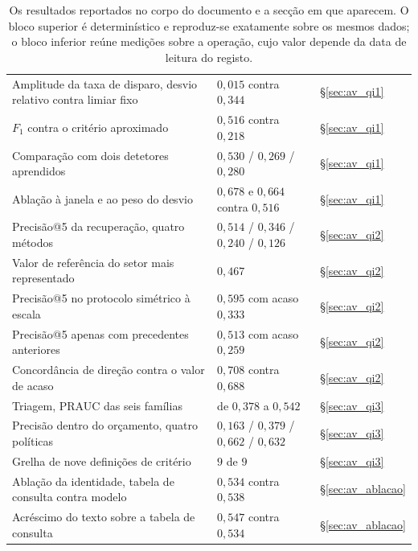 \begin{table}[!htbp]
\caption[Cada resultado e o procedimento que o produz]{Os resultados reportados no corpo do
documento e a secção em que aparecem. O bloco superior é determinístico e reproduz-se exatamente
sobre os mesmos dados; o bloco inferior reúne medições sobre a operação, cujo valor depende da data
de leitura do registo.}
\label{tab:ap_numeros}
\centering
\small
\begin{tabular}{p{} L{0.21\textwidth} L{0.19\textwidth}}
\toprule
{} &  &  \\
\midrule
Amplitude da taxa de disparo, desvio relativo contra limiar fixo & $0{,}015$ contra $0{,}344$ &
§\ref{sec:av_qi1} \\
$F_1$ contra o critério aproximado & $0{,}516$ contra $0{,}218$ & §\ref{sec:av_qi1} \\
Comparação com dois detetores aprendidos & $0{,}530$ / $0{,}269$ / $0{,}280$ & §\ref{sec:av_qi1} \\
Ablação à janela e ao peso do desvio & $0{,}678$ e $0{,}664$ contra $0{,}516$ & §\ref{sec:av_qi1} \\
\addlinespace
Precisão@5 da recuperação, quatro métodos & $0{,}514$ / $0{,}346$ / $0{,}240$ / $0{,}126$ &
§\ref{sec:av_qi2} \\
Valor de referência do setor mais representado & $0{,}467$ & §\ref{sec:av_qi2} \\
Precisão@5 no protocolo simétrico à escala & $0{,}595$ com acaso $0{,}333$ & §\ref{sec:av_qi2} \\
Precisão@5 apenas com precedentes anteriores & $0{,}513$ com acaso $0{,}259$ & §\ref{sec:av_qi2} \\
Concordância de direção contra o valor de acaso & $0{,}708$ contra $0{,}688$ & §\ref{sec:av_qi2} \\
\addlinespace
Triagem, \gls{PRAUC} das seis famílias & de $0{,}378$ a $0{,}542$ & §\ref{sec:av_qi3} \\
Precisão dentro do orçamento, quatro políticas & $0{,}163$ / $0{,}379$ / $0{,}662$ / $0{,}632$ &
§\ref{sec:av_qi3} \\
Grelha de nove definições de critério & $9$ de $9$ & §\ref{sec:av_qi3} \\
Ablação da identidade, tabela de consulta contra modelo & $0{,}534$ contra $0{,}538$ &
§\ref{sec:av_ablacao} \\
Acréscimo do texto sobre a tabela de consulta & $0{,}547$ contra $0{,}534$ & §\ref{sec:av_ablacao} \\

\end{tabular}
\end{table}
